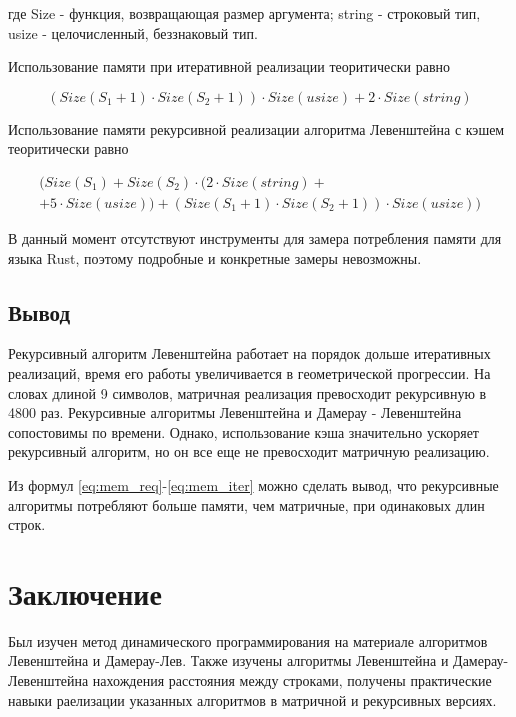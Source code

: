 \documentclass[14pt,russian]{scrartcl}
\newcommand{\anonsection}[1]{\cleardoublepage
\phantomsection
\addcontentsline{toc}{section}{\protect\numberline{}#1}
\section*{#1}\vspace*{2.5ex} %
}
\begin{document}
	\noindent
	где Size - функция, возвращающая размер аргумента; string - строковый тип, usize - целочисленный, беззнаковый тип.

	\par
	Использование памяти при итеративной реализации теоритически равно

	\begin{equation}
		\label{eq:mem_req}
		(Size(S_{1} + 1) \cdot Size(S_{2} + 1)) \cdot Size(usize) + 2 \cdot Size(string)
	\end{equation}

	\par
	Использование памяти рекурсивной реализации алгоритма Левенштейна с кэшем теоритически равно

	\begin{multline}
		\label{eq:mem_iter}
		(Size(S_{1}) + Size(S_{2}) \cdot (2 \cdot Size(string) +\\+ 5 \cdot Size(usize)) + (Size(S_{1} + 1) \cdot Size(S_{2} + 1)) \cdot Size(usize))
	\end{multline}

	\par
	В данный момент отсутствуют инструменты для замера потребления памяти для языка Rust, поэтому подробные и конкретные замеры невозможны.

	\subsection{Вывод}

	\par
	Рекурсивный алгоритм Левенштейна работает на порядок дольше итеративных реализаций, время его работы увеличивается в геометрической прогрессии. На словах длиной 9 символов, матричная реализация превосходит рекурсивную в 4800 раз. Рекурсивные алгоритмы Левенштейна и Дамерау - Левенштейна сопостовимы по времени. Однако, использование кэша значительно ускоряет рекурсивный алгоритм, но он все еще не превосходит матричную реализацию.

	Из формул \ref{eq:mem_req}-\ref{eq:mem_iter} можно сделать вывод, что рекурсивные алгоритмы потребляют больше памяти, чем матричные, при одинаковых длин строк.

	\anonsection{Заключение}

	Был изучен метод динамического программирования на материале алгоритмов Левенштейна и Дамерау-Лев.
	Также изучены алгоритмы Левенштейна и Дамерау-Левенштейна нахождения расстояния между строками, получены практические навыки раелизации указанных алгоритмов
	в матричной  и рекурсивных версиях. 
	\newline
\end{document}
